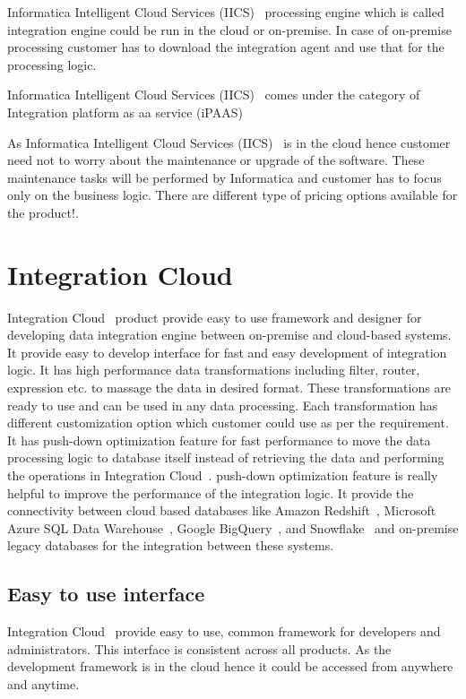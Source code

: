 Informatica Intelligent Cloud Services (IICS)~\cite{hid-sp18-511-iics} processing engine which is called integration engine could be run in the cloud or on-premise. In case of on-premise processing customer has to download the integration agent and use that for the processing logic.

Informatica Intelligent Cloud Services (IICS)~\cite{hid-sp18-511-iics} comes under the category of Integration platform as aa service (iPAAS)~\cite{hid-sp18-511-ipaas}

As Informatica Intelligent Cloud Services (IICS)~\cite{hid-sp18-511-iics} is in the cloud hence customer need not to worry about the maintenance or upgrade of the software. These maintenance tasks will be performed by Informatica and customer has to focus only on the business logic. There are different type of pricing options available for the product!\cite{hid-sp18-511-iics-pricing}.

\section{Integration Cloud}

Integration Cloud~\cite{hid-sp18-511-iics} product provide easy to use
framework and designer for developing data integration engine between on-premise
and cloud-based systems. It provide easy to develop interface for fast and easy development of integration logic. It has high performance data transformations including filter, router, expression etc. to massage the data in desired format. These transformations are ready to use and can be used in any data processing. Each transformation has different customization option which customer could use as per the requirement. It has push-down optimization feature
for fast performance to move the data processing logic to database itself
instead of retrieving the data and performing the operations in Integration Cloud~\cite{hid-sp18-511-iics}. push-down optimization feature is really helpful to improve the performance of the integration logic. It provide the
connectivity between cloud based databases like Amazon
Redshift~\cite{hid-sp18-511-aws-redshift}, Microsoft Azure SQL Data
Warehouse~\cite{hid-sp18-511-ms-azure-sql}, Google
BigQuery~\cite{hid-sp18-511-google-bigquery}, and
Snowflake~\cite{hid-sp18-511-snowflake} and on-premise legacy databases for the integration between these systems.

\subsection{Easy to use interface}
Integration Cloud~\cite{hid-sp18-511-iics} provide easy to use, common framework for developers and administrators. This interface is consistent across all products. As the development framework is in the cloud hence it could be accessed from anywhere and anytime.

